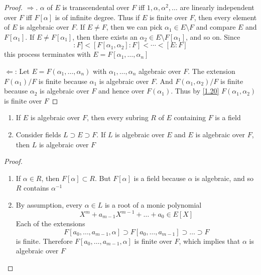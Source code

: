 \documentclass[11pt]{article}
\begin{document}
\begin{proof}
\(\Rightarrow\). \(\alpha\) of \(E\) is transcendental over \(F\) iff \(1,\alpha,\alpha^2,\dots\) are linearly independent
over \(F\) iff \(F[\alpha]\) is of infinite degree. Thus if \(E\) is finite over \(F\), then every
element of \(E\) is algebraic over \(F\). If \(E\neq F\), then we can pick \(\alpha_1\in E\setminus F\) and
compare \(E\) and \(F[\alpha_1]\). If \(E\neq F[\alpha_1]\), then there exists an \(\alpha_2\in E\setminus F[\alpha_1]\), and so on.
Since
\begin{equation*}
[F[\alpha_1]:F]<[F[\alpha_1,\alpha_2]:F]<\cdots<[E:F]
\end{equation*}
this process terminates with \(E=F[\alpha_1,\dots,\alpha_n]\)

\(\Leftarrow\): Let \(E=F(\alpha_1,\dots,\alpha_n)\) with \(\alpha_1,\dots,\alpha_n\) algebraic over \(F\). The extension \(F(\alpha_1)/F\)
is finite because \(\alpha_1\) is algebraic over \(F\). And \(F(\alpha_1,\alpha_2)/F\) is finite because \(\alpha_2\) is
algebraic over \(F\) and hence over \(F(\alpha_1)\). Thus by \ref{1.20} \(F(\alpha_1,\alpha_2)\) is finite over \(F\)
\end{proof}

\begin{corollary}[]
\begin{enumerate}
\item If \(E\) is algebraic over \(F\), then every subring \(R\) of \(E\) containing \(F\) is a field
\item Consider fields \(L\supset E\supset F\). If \(L\) is algebraic over \(E\) and \(E\) is algebraic
over \(F\), then \(L\) is algebraic over \(F\)
\end{enumerate}
\end{corollary}

\begin{proof}
\begin{enumerate}
\item If \(\alpha\in R\), then \(F[\alpha]\subset R\). But \(F[\alpha]\) is a field because \(\alpha\) is algebraic, and so \(R\)
contains \(\alpha^{-1}\)
\item By assumption, every \(\alpha\in L\) is a root of a monic polynomial
\begin{equation*}
X^m+a_{m-1}X^{m-1}+\dots+a_0\in E[X]
\end{equation*}
Each of the extensions
\begin{equation*}
F[a_0,\dots,a_{m-1},\alpha]\supset F[a_0,\dots,a_{m-1}]\supset\dots\supset F
\end{equation*}
is finite. Therefore \(F[a_0,\dots,a_{m-1},\alpha]\) is finite over \(F\), which implies that \(\alpha\) is
algebraic over \(F\)
\end{enumerate}
\end{proof}
\end{document}
